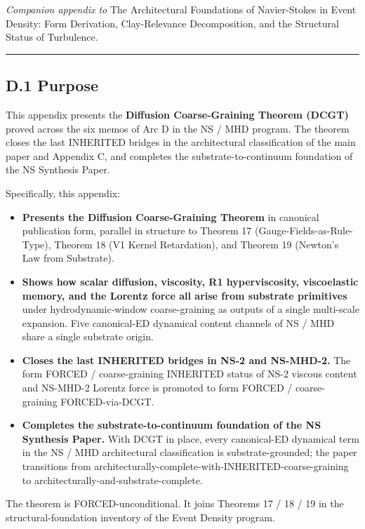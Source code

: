 \documentclass[
]{article}
\providecommand{\tightlist}{%
  \setlength{\itemsep}{0pt}\setlength{\parskip}{0pt}}
\begin{document}
\emph{Companion appendix to} The Architectural Foundations of
Navier-Stokes in Event Density: Form Derivation, Clay-Relevance
Decomposition, and the Structural Status of Turbulence.

\begin{center}\rule{0.5\linewidth}{0.5pt}\end{center}

\subsection{D.1 Purpose}\label{d.1-purpose}

This appendix presents the \textbf{Diffusion Coarse-Graining Theorem
(DCGT)} proved across the six memos of Arc D in the NS / MHD program.
The theorem closes the last INHERITED bridges in the architectural
classification of the main paper and Appendix C, and completes the
substrate-to-continuum foundation of the NS Synthesis Paper.

Specifically, this appendix:

\begin{itemize}
\tightlist
\item
  \textbf{Presents the Diffusion Coarse-Graining Theorem} in canonical
  publication form, parallel in structure to Theorem 17
  (Gauge-Fields-as-Rule-Type), Theorem 18 (V1 Kernel Retardation), and
  Theorem 19 (Newton's Law from Substrate).
\item
  \textbf{Shows how scalar diffusion, viscosity, R1 hyperviscosity,
  viscoelastic memory, and the Lorentz force all arise from substrate
  primitives} under hydrodynamic-window coarse-graining as outputs of a
  single multi-scale expansion. Five canonical-ED dynamical content
  channels of NS / MHD share a single substrate origin.
\item
  \textbf{Closes the last INHERITED bridges in NS-2 and NS-MHD-2.} The
  form FORCED / coarse-graining INHERITED status of NS-2 viscous content
  and NS-MHD-2 Lorentz force is promoted to form FORCED /
  coarse-graining FORCED-via-DCGT.
\item
  \textbf{Completes the substrate-to-continuum foundation of the NS
  Synthesis Paper.} With DCGT in place, every canonical-ED dynamical
  term in the NS / MHD architectural classification is
  substrate-grounded; the paper transitions from
  architecturally-complete-with-INHERITED-coarse-graining to
  architecturally-and-substrate-complete.
\end{itemize}

The theorem is FORCED-unconditional. It joins Theorems 17 / 18 / 19 in
the structural-foundation inventory of the Event Density program.
\end{document}

